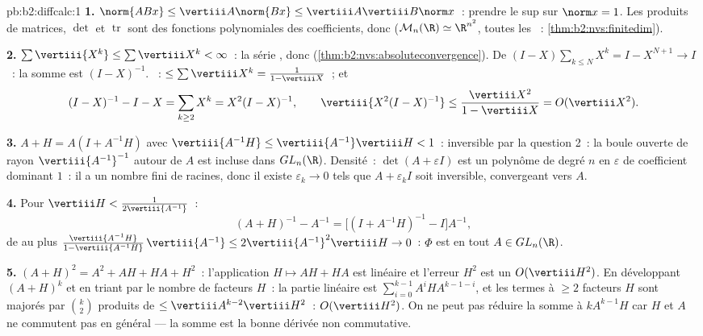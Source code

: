 \begin{solution}{pb:b2:diffcalc:1}
\textbf{1.} $\norm{ABx} \leq \vertiii A\norm{Bx} \leq
\vertiii A\vertiii B\norm x$~: prendre le sup sur $\norm x = 1$.
Les produits de matrices, $\det$ et $\operatorname{tr}$ sont des
fonctions polynomiales des coefficients, donc  ($\mathcal M_n(\R)
\simeq \R^{n^2}$, toutes les ~:
\cref{thm:b2:nvs:finitedim}).

\textbf{2.} $\sum\vertiii{X^k} \leq \sum\vertiii X^k <
\infty$~: la série  , donc 
(\cref{thm:b2:nvs:absoluteconvergence}). De $(I -
X)\sum_{k\leq N}X^k = I - X^{N+1} \to I$~: la somme est $(I -
X)^{-1}$. ~: $\leq \sum\vertiii X^k = \frac{1}{1 -
\vertiii X}$~; et
\[
(I - X)^{-1} - I - X = \sum_{k\geq2}X^k = X^2(I - X)^{-1},
\qquad
\vertiii{X^2(I-X)^{-1}} \leq
\frac{\vertiii X^2}{1 - \vertiii X} = O(\vertiii X^2).
\]

\textbf{3.} $A + H = A(I + A^{-1}H)$ avec $\vertiii{A^{-1}H}
\leq \vertiii{A^{-1}}\vertiii H < 1$~: inversible par la question 2~:
la boule ouverte de rayon $\vertiii{A^{-1}}^{-1}$ autour de $A$ est
incluse dans $GL_n(\R)$. Densité~: $\det(A + \varepsilon I)$ est un
polynôme de degré $n$ en $\varepsilon$ de coefficient dominant $1$~:
il a un nombre fini de racines, donc il existe $\varepsilon_k \to 0$
tels que $A + \varepsilon_kI$ soit inversible, convergeant vers $A$.

\textbf{4.} Pour $\vertiii H < \frac{1}{2\vertiii{A^{-1}}}$~:
\[
(A + H)^{-1} - A^{-1}
= \bigl[(I + A^{-1}H)^{-1} - I\bigr]A^{-1},
\]
de  au plus $\frac{\vertiii{A^{-1}H}}{1 -
\vertiii{A^{-1}H}}\,\vertiii{A^{-1}} \leq
2\vertiii{A^{-1}}^2\vertiii H \to 0$~: $\Phi$ est  en
tout $A \in GL_n(\R)$.

\textbf{5.} $(A+H)^2 = A^2 + AH + HA + H^2$~: l'application $H
\mapsto AH + HA$ est linéaire et l'erreur $H^2$ est un
$O(\vertiii H^2)$. En développant $(A + H)^k$ et en triant par le
nombre de facteurs $H$~: la partie linéaire est
$\sum_{i=0}^{k-1}A^iHA^{k-1-i}$, et les termes à $\geq 2$
facteurs $H$ sont majorés par $\binom k2$ produits de 
$\leq \vertiii A^{k-2}\vertiii H^2$~: $O(\vertiii H^2)$.
On ne peut pas réduire la somme à $kA^{k-1}H$ car $H$ et $A$
ne commutent pas en général --- la somme est la bonne dérivée
non commutative.


\end{solution}

